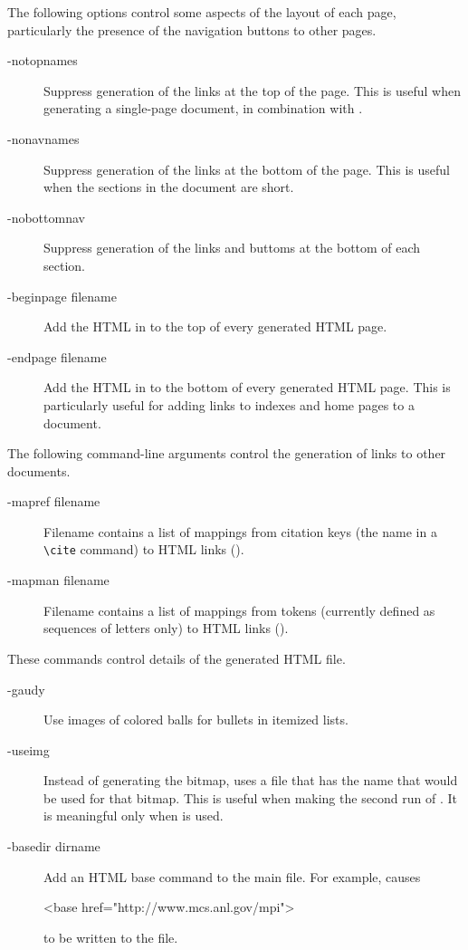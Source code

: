 The following options control some aspects of the layout of each page,
particularly the 
presence of the navigation buttons to other pages.
\begin{description}
\item[-notopnames]Suppress generation of the links at the top of the
page.  This is useful when generating a single-page document, in combination
with .

\item[-nonavnames]Suppress generation of the links at the bottom of the
page.  This is useful when the sections in the document are short.

\item[-nobottomnav]Suppress generation of the links and buttoms at the
bottom of each section.

\item[-beginpage filename]Add the HTML in  to the top of every
generated HTML page.

\item[-endpage filename]Add the HTML in  to the bottom of every
generated HTML page.  This is particularly useful for adding links to indexes
and home pages to a document.
\end{description}


The following command-line arguments control the generation of links to other
documents. 
\begin{description}

\item[-mapref filename]Filename contains a list of mappings from citation keys
(the name in a \verb+\cite+ command) to HTML links (). 

\item[-mapman filename]Filename contains a list of mappings from tokens
(currently defined as sequences of letters only) to HTML links  
().
\end{description}

These commands control details of the generated HTML file.

\begin{description}
\item[-gaudy]Use images of colored balls for
bullets in itemized lists.

\item[-useimg]Instead of generating the bitmap, uses a file that has the name
that would be used for that bitmap.  This
is useful when making the second run of .  It is meaningful only when
 is used.

\item[-basedir dirname]Add an HTML base command to the main file.
For example, \gb{} causes
\begin{example}
<base href="http://www.mcs.anl.gov/mpi">
\end{example}
to be written to the file.

\end{description}

